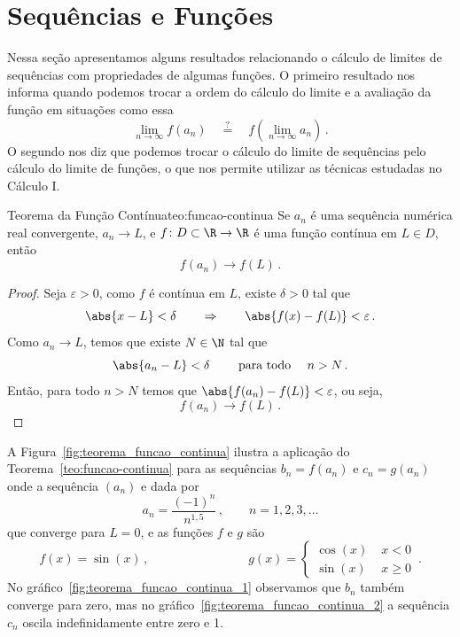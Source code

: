 \section{Sequências e Funções}

Nessa seção apresentamos alguns resultados relacionando o cálculo de limites
de sequências com propriedades de algumas funções. O primeiro resultado
nos informa quando podemos trocar a ordem do cálculo do limite
e a avaliação da função em situações como essa
\[
  \lim_{n\to\infty} f(a_n)
  \quad \stackrel{\text{?}}{=} \quad
  f\left( \lim_{n\to\infty} a_n \right)   \,.
\]
O segundo nos diz que podemos trocar o cálculo do limite de sequências
pelo cálculo do limite de funções, o que nos permite utilizar as técnicas
estudadas no Cálculo I.

\begin{teorema}{Teorema da Função Contínua}{teo:funcao-continua}
  Se $a_n$ é uma sequência numérica real convergente, $a_n\to L$,
  e $f\colon D\subset\R\to\R$ é uma
  função contínua em $L\in D$, então
  \[
    f(a_n)\to f(L) \,.
  \]
\end{teorema}

\begin{proof}
  Seja $\varepsilon>0$, como $f$ é contínua em $L$, existe $\delta>0$ tal que
  \[
    \abs{x-L}<\delta
    \qquad \Rightarrow \qquad
    \abs{f(x)-f(L)}<\varepsilon \,.
  \]
  Como $a_n\to L$, temos que existe $N\in\N$ tal que
  \[
    \abs{a_n-L}<\delta
    \qquad \text{ para todo } \quad
    n > N \,.
  \]
  Então, para todo $n>N$ temos que $\abs{f(a_n)-f(L)}<\varepsilon$, ou seja,
  \[
    f(a_n)\to f(L) \,.
  \]
\end{proof}

A Figura~\ref{fig:teorema_funcao_continua} ilustra a aplicação do
Teorema~\ref{teo:funcao-continua} para as sequências
\(b_n = f(a_n)\) e \(c_n=g(a_n)\)
onde a sequência $(a_n)$ e dada por
\[
  a_n = \frac{(-1)^n}{n^{1,5}}   \,,
  \qquad
  n = 1, 2, 3, \dots
\]
que converge para $L=0$, e as funções $f$ e $g$ são
\[
  f(x) = \sin(x)           \,,
  \qquad\qquad\qquad\qquad
  g(x) = \begin{cases}
    \cos(x) & \; x<0 \\
    \sin(x) & \; x\geq 0
  \end{cases}              \,.
\]
No gráfico~\ref{fig:teorema_funcao_continua_1} observamos
que $b_n$ também converge para zero, mas no
gráfico~\ref{fig:teorema_funcao_continua_2} a sequência $c_n$
oscila indefinidamente entre zero e 1.

